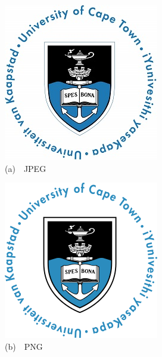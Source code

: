 \vspace{5mm}
\hfill
\begin{minipage}[b]{0.3\textwidth}\centering\setlength{\parindent}{0mm}
\includegraphics[width=\textwidth]{3_Chapters/5_Chapter_Results/Figures/UCT.jpg}\\%
{\small (a)~~JPEG}%
\end{minipage}
\hfill
\begin{minipage}[b]{0.3\textwidth}\centering\setlength{\parindent}{0mm}
\includegraphics[width=\textwidth]{3_Chapters/5_Chapter_Results/Figures/UCT.png}\\%
{\small (b)~~PNG}%
\end{minipage}
